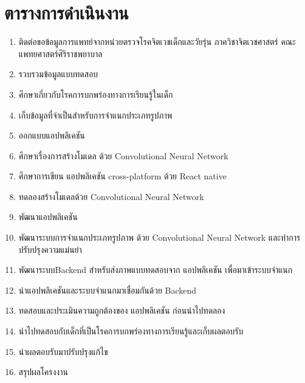 \documentclass[12pt,oneside,openright,a4paper]{cpe-thai-project}
\begin{document}
\section{ตารางการดำเนินงาน}
\begin{enumerate}
  \item ติดต่อขอข้อมูลการแพทย์จากหน่วยตรวจโรคจิตเวชเด็กและวัยรุ่น ภาควิชาจิตเวชศาสตร์ คณะแพทยศาสตร์ศิริราชพยาบาล
  \item รวบรวมข้อมูลแบบทดสอบ
  \item ศึกษาเกี่ยวกับโรคการบกพร่องทางการเรียนรู้ในเด็ก
  \item เก็บข้อมูลที่จำเป็นสำหรับการจำแนกประเภทรูปภาพ
  \item ออกแบบแอปพลิเคชัน
  \item ศึกษาเรื่องการสร้างโมเดล ด้วย Convolutional Neural Network
  \item ศึกษาการเขียน แอปพลิเคชัน cross-platform ด้วย React native
  \item ทดลองสร้างโมเดลด้วย Convolutional Neural Network
  \item พัฒนาแอปพลิเคชัน
  \item พัฒนาระบบการจำแนกประเภทรูปภาพ ด้วย Convolutional Neural Network และทำการปรับปรุงความแม่นยำ
  \item พัฒนาระบบBackend สำหรับส่งภาพแบบทดสอบจาก แอปพลิเคชัน เพื่อมาเข้าระบบจำแนก
  \item นำแอปพลิเคชันและระบบจำแนกมาเชื่อมกันด้วย Backend
  \item ทดสอบและประเมินความถูกต้องของ แอปพลิเคชัน ก่อนนำไปทดลอง
  \item นำไปทดสอบกับเด็กที่เป็นโรคการบกพร่องทางการเรียนรู้และเก็บผลตอบรับ
  \item นำผลตอบรับมาปรับปรุงแก้ไข
  \item สรุปผลโครงงาน
\end{enumerate}
\end{document}
